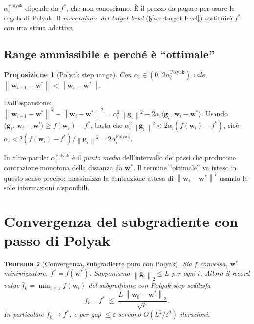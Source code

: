\documentclass[11pt,a4paper]{article}
\newcommand{\norm}[1]{\left\|#1\right\|}
\newcommand{\inner}[2]{\langle #1,\,#2\rangle}
\newcommand{\bw}{\mathbf{w}}
\newcommand{\bg}{\mathbf{g}}
\newtheorem{theorem}{Teorema}[section]
\newtheorem{proposition}[theorem]{Proposizione}
\theoremstyle{definition}
\begin{document}
\begin{tcolorbox}[warning]
$\alpha_i^{\text{Polyak}}$ dipende da $f^*$, che non conosciamo. È il prezzo da pagare per usare la regola di Polyak. Il \emph{meccanismo del target level} (\S\ref{sec:target-level}) sostituirà $f^*$ con una stima adattiva.
\end{tcolorbox}

\subsection{Range ammissibile e perché è ``ottimale''}

\begin{proposition}[Polyak step range]
Con $\alpha_i\in(0,\,2\alpha_i^{\text{Polyak}})$ vale $\norm{\bw_{i+1}-\bw^*} < \norm{\bw_i-\bw^*}$.
\end{proposition}

\begin{tcolorbox}[proofbox]
Dall'espansione:
$\norm{\bw_{i+1}-\bw^*}^2 - \norm{\bw_i-\bw^*}^2 = \alpha_i^2\norm{\bg_i}^2 - 2\alpha_i\inner{\bg_i}{\bw_i-\bw^*}.$
Usando $\inner{\bg_i}{\bw_i-\bw^*}\ge f(\bw_i)-f^*$, basta che $\alpha_i^2\norm{\bg_i}^2 < 2\alpha_i(f(\bw_i)-f^*)$, cioè $\alpha_i < 2(f(\bw_i)-f^*)/\norm{\bg_i}^2 = 2\alpha_i^{\text{Polyak}}$.
\end{tcolorbox}

In altre parole: $\alpha_i^{\text{Polyak}}$ è il \emph{punto medio} dell'intervallo dei passi che producono contrazione monotona della distanza da $\bw^*$. Il termine ``ottimale'' va inteso in questo senso preciso: massimizza la contrazione attesa di $\norm{\bw_i-\bw^*}^2$ usando le sole informazioni disponibili.

\section{Convergenza del subgradiente con passo di Polyak}
\label{sec:plain-convergence}

\begin{theorem}[Convergenza, subgradiente puro con Polyak]
\label{thm:plain-poly}
Sia $f$ convessa, $\bw^*$ minimizzatore, $f^* = f(\bw^*)$. Supponiamo $\norm{\bg_i}_2\le L$ per ogni $i$. Allora il record value $\bar f_k = \min_{i\le k} f(\bw_i)$ del subgradiente con Polyak step soddisfa
\begin{equation}
\label{eq:plain-rate}
\bar f_k - f^* \;\le\; \frac{L\,\norm{\bw_0-\bw^*}_2}{\sqrt{k}}.
\end{equation}
In particolare $\bar f_k\to f^*$, e per gap $\le\varepsilon$ servono $O(L^2/\varepsilon^2)$ iterazioni.
\end{theorem}
\end{document}
